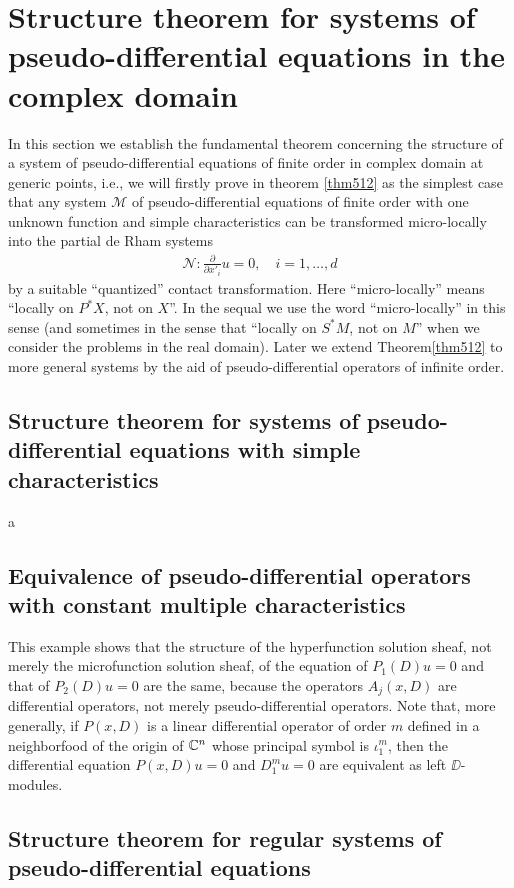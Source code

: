 \section{Structure theorem for systems of pseudo-differential equations in the complex domain}
In this section we establish the fundamental theorem 
concerning the structure of a system of pseudo-differential equations 
of finite order in complex domain at generic points, 
i.e., we will firstly prove in theorem \ref{thm512} 
as the simplest case that any system $\mathscr{M}$ of 
pseudo-differential equations of finite order with one unknown
function and simple characteristics can be transformed micro-locally 
into the partial de Rham systems
\begin{align*}
    \mathscr{N} \colon \frac{\partial}{\partial x'_i}u = 0, \quad i = 1,\ldots,d
\end{align*}
by a suitable ``quantized'' contact transformation.
Here ``micro-locally'' means ``locally on $P^\ast X$, not on $X$''. 
In the sequal we use the word ``micro-locally'' 
in this sense (and sometimes in the sense that ``locally on 
$S^{\ast}M$, not on $M$'' when we consider the problems in the real domain).
Later we extend Theorem\ref{thm512} to more general systems 
by the aid of pseudo-differential operators of infinite order.

\subsection{Structure theorem for systems of pseudo-differential equations with simple characteristics}

\begin{thm}\label{thm512}
    a
\end{thm}

\subsection{Equivalence of pseudo-differential operators with constant multiple characteristics}

\begin{rem}
    This example shows that the structure of the hyperfunction
    solution sheaf, not merely the microfunction solution sheaf, of 
    the equation of $P_1(D)u = 0$ and that of $P_2(D)u = 0$ are the same, 
    because the operators $A_j(x,D)$ are differential operators, not merely 
    pseudo-differential operators. Note that, more generally, 
    if $P(x,D)$ is a linear differential operator of order $m$ 
    defined in a neighborfood of the origin of $\mathbb{C}^n$ whose 
    principal symbol is $\iota^m_1$, then the differential equation 
    $P(x,D)u=0$ and $D_1^mu=0$ are equivalent as left $\DD$-modules.
\end{rem}
\subsection{Structure theorem for regular systems of pseudo-differential equations}
